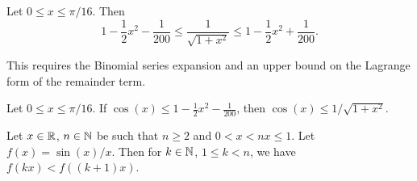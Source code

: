 \begin{proposition}
  Let $0\leq x\leq\pi/16$. Then
  \begin{equation}
1 - \frac{1}{2}x^{2} - \frac{1}{200} \leq\frac{1}{\sqrt{1 + x^{2}}}\leq1 - \frac{1}{2}x^{2} + \frac{1}{200}.
  \end{equation}
\end{proposition}

\begin{remark}
This requires the Binomial series expansion and an upper bound on the
Lagrange form of the remainder term.
\end{remark}

\begin{proposition}
Let $0\leq x\leq\pi/16$.
If $\cos(x)\leq 1 - \frac{1}{2}x^{2} - \frac{1}{200}$, then $\cos(x)\leq 1/\sqrt{1 + x^{2}}$.
\end{proposition}

\begin{lemma}
Let $x\in\mathbb{R}$, $n\in\mathbb{N}$ be such that $n\geq2$ and $0<x<nx\leq1$.
Let $f(x) = \sin(x)/x$.
Then for $k\in\mathbb{N}$, $1\leq k < n$, we have $f(kx) < f((k+1)x)$.
\end{lemma}

